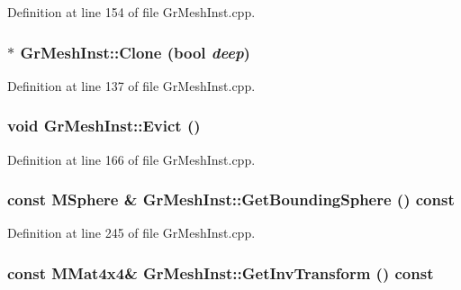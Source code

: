 Definition at line 154 of file GrMeshInst.cpp.\hypertarget{class_gr_mesh_inst_bf9b7e7034565212105f98fedc9553cf}{
\subsubsection[{Clone}]{ $\ast$ GrMeshInst::Clone (bool {\em deep})}}
\label{class_gr_mesh_inst_bf9b7e7034565212105f98fedc9553cf}




Definition at line 137 of file GrMeshInst.cpp.\hypertarget{class_gr_mesh_inst_68b3d9c5002c1aee40039aa74a3773e5}{
\subsubsection[{Evict}]{\setlength{\rightskip}{0pt plus 5cm}void GrMeshInst::Evict ()}}
\label{class_gr_mesh_inst_68b3d9c5002c1aee40039aa74a3773e5}




Definition at line 166 of file GrMeshInst.cpp.\hypertarget{class_gr_mesh_inst_1990762b53bf2a9b8bfdf205606d160b}{
\subsubsection[{GetBoundingSphere}]{\setlength{\rightskip}{0pt plus 5cm}const {\bf MSphere} \& GrMeshInst::GetBoundingSphere () const}}
\label{class_gr_mesh_inst_1990762b53bf2a9b8bfdf205606d160b}




Definition at line 245 of file GrMeshInst.cpp.\hypertarget{class_gr_mesh_inst_34b8224971a8f2756d1eadb4af5e9124}{
\subsubsection[{GetInvTransform}]{\setlength{\rightskip}{0pt plus 5cm}const {\bf MMat4x4}\& GrMeshInst::GetInvTransform () const}}
\label{class_gr_mesh_inst_34b8224971a8f2756d1eadb4af5e9124}




